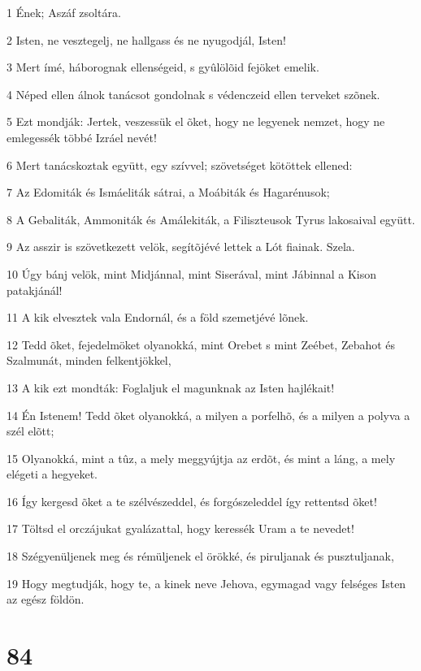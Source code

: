 \par 1 Ének; Aszáf zsoltára.
\par 2 Isten, ne vesztegelj, ne hallgass és ne nyugodjál, Isten!
\par 3 Mert ímé, háborognak ellenségeid, s gyûlölõid fejöket emelik.
\par 4 Néped ellen álnok tanácsot gondolnak s védenczeid ellen terveket szõnek.
\par 5 Ezt mondják: Jertek, veszessük el õket, hogy ne legyenek nemzet, hogy ne emlegessék többé Izráel nevét!
\par 6 Mert tanácskoztak együtt, egy szívvel; szövetséget kötöttek ellened:
\par 7 Az Edomiták és Ismáeliták sátrai, a Moábiták és Hagarénusok;
\par 8 A Gebaliták, Ammoniták és Amálekiták, a Filiszteusok Tyrus lakosaival együtt.
\par 9 Az asszir is szövetkezett velök, segítõjévé lettek a Lót fiainak. Szela.
\par 10 Úgy bánj velök, mint Midjánnal, mint Siserával, mint Jábinnal a Kison patakjánál!
\par 11 A kik elvesztek vala Endornál, és a föld szemetjévé lõnek.
\par 12 Tedd õket, fejedelmöket olyanokká, mint Orebet s mint Zeébet, Zebahot és Szalmunát, minden felkentjökkel,
\par 13 A kik ezt mondták: Foglaljuk el magunknak az Isten hajlékait!
\par 14 Én Istenem! Tedd õket olyanokká, a milyen a porfelhõ, és a milyen a polyva a szél elõtt;
\par 15 Olyanokká, mint a tûz, a mely meggyújtja az erdõt, és mint a láng, a mely elégeti a hegyeket.
\par 16 Így kergesd õket a te szélvészeddel, és forgószeleddel így rettentsd õket!
\par 17 Töltsd el orczájukat gyalázattal, hogy keressék Uram a te nevedet!
\par 18 Szégyenüljenek meg és rémüljenek el örökké, és piruljanak és pusztuljanak,
\par 19 Hogy megtudják, hogy te, a kinek neve Jehova, egymagad vagy felséges Isten az egész földön.

\chapter{84}

